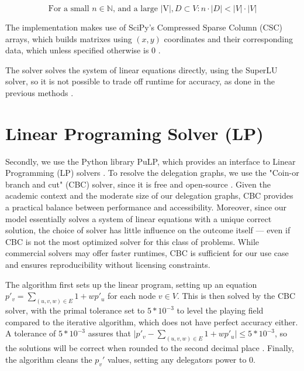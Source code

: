 \[
\text{For a small } n \in \mathbb{N} \text{, and a large |V|}, D \subset V: n \cdot |D| < |V| \cdot |V|
\]

 
 The implementation makes use of SciPy's Compressed Sparse Column (CSC) arrays, which builds matrixes using $(x,y)$ coordinates and their corresponding data, which unless specified otherwise is 0 \cite{virtanenSciPy10Fundamental2020}. 

The solver solves the system of linear equations directly, using the SuperLU solver, so it is not possible to trade off runtime for accuracy, as done in the previous methods \cite{liSuperLUUsersGuide1999}. 

\section{Linear Programing Solver (LP)}

Secondly, we use the Python library PuLP, which provides an interface to Linear Programming (LP) solvers \cite{osullivanPuLPLinearProgramming2011}. To resolve the delegation graphs, we use the "Coin-or branch and cut" (CBC) solver, since it is free and open-source \cite{johnforrestCoinorCbcRelease2024}. Given the academic context and the moderate size of our delegation graphs, CBC provides a practical balance between performance and accessibility. Moreover, since our model essentially solves a system of linear equations with a unique correct solution, the choice of solver has little influence on the outcome itself — even if CBC is not the most optimized solver for this class of problems. While commercial solvers may offer faster runtimes, CBC is sufficient for our use case and ensures reproducibility without licensing constraints.

The algorithm first sets up the linear program, setting up an equation $p'_v = \sum_{(u, v, w) \in E} 1 + wp'_u$ for each node $v \in V$. This is then solved by the CBC solver, with the primal tolerance set to $5*10^{-3}$ to level the playing field compared to the iterative algorithm, which does not have perfect accuracy either. A tolerance of $5 * 10^{-3}$ assures that $\lvert p'_v -\sum_{(u, v, w) \in E} 1 + wp'_u \rvert \le 5*10^{-3}$, so the solutions will be correct when rounded to the second decimal place \cite{forrestCBCUserGuide2005}. Finally, the algorithm cleans the $p_v'$ values, setting any delegators power to 0. 



